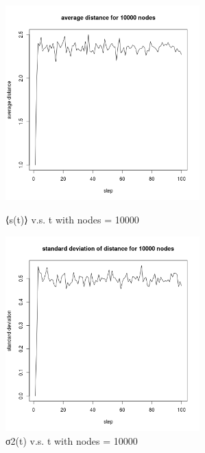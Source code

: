 \documentclass[draftcls,12pt,onecolumn]{IEEEtran}
\begin{document}
\begin{figure}[htbp]
\centering
\begin{minipage}[t]{0.48\textwidth}
\centering
\includegraphics[width=7.5cm]{2_1_d_10000_distance.png}
\caption{⟨s(t)⟩ v.s. t with nodes = 10000}
\label{fig07}
\end{minipage}
\begin{minipage}[t]{0.48\textwidth}
\centering
\includegraphics[width=7.5cm]{2_1_d_10000_deviation.png}
\caption{σ2(t) v.s. t with nodes = 10000}
\label{fig08}
\end{minipage}
\end{figure}
\end{document}
